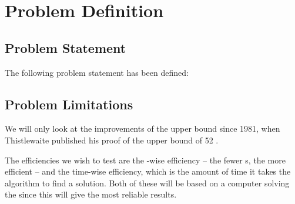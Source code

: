 \chapter{Problem Definition}
\emptyTop{}

\section{Problem Statement}
The following problem statement has been defined:




\section{Problem Limitations}
\label{sec:problemLimitations}
We will only look at the improvements of the upper bound since 1981, when Thistlewaite published his proof of the upper bound of 52 \cite{knowledgerush2}.%

The efficiencies we wish to test are the \twist{}-wise efficiency -- the fewer \twist{}s, the more efficient -- and the time-wise efficiency, which is the amount of time it takes the algorithm to find a solution.
Both of these will be based on a computer solving the \rubik{} since this will give the most reliable results.


